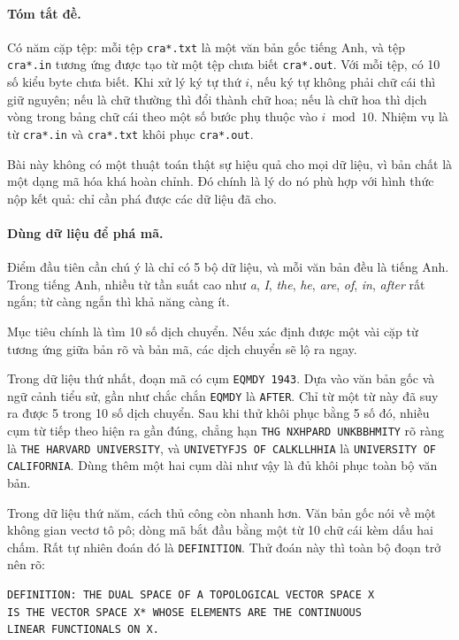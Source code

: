 \documentclass[11pt]{article}
\begin{document}
\paragraph{Tóm tắt đề.}
Có năm cặp tệp: mỗi tệp \texttt{cra*.txt} là một văn bản gốc tiếng Anh, và
tệp \texttt{cra*.in} tương ứng được tạo từ một tệp chưa biết
\texttt{cra*.out}. Với mỗi tệp, có 10 số kiểu byte chưa biết. Khi xử lý ký tự
thứ \(i\), nếu ký tự không phải chữ cái thì giữ nguyên; nếu là chữ thường thì
đổi thành chữ hoa; nếu là chữ hoa thì dịch vòng trong bảng chữ cái theo một
số bước phụ thuộc vào \(i\bmod 10\). Nhiệm vụ là từ \texttt{cra*.in} và
\texttt{cra*.txt} khôi phục \texttt{cra*.out}.

Bài này không có một thuật toán thật sự hiệu quả cho mọi dữ liệu, vì bản chất
là một dạng mã hóa khá hoàn chỉnh. Đó chính là lý do nó phù hợp với hình thức
nộp kết quả: chỉ cần phá được các dữ liệu đã cho.

\paragraph{Dùng dữ liệu để phá mã.}
Điểm đầu tiên cần chú ý là chỉ có 5 bộ dữ liệu, và mỗi văn bản đều là tiếng
Anh. Trong tiếng Anh, nhiều từ tần suất cao như \textit{a}, \textit{I},
\textit{the}, \textit{he}, \textit{are}, \textit{of}, \textit{in},
\textit{after} rất ngắn; từ càng ngắn thì khả năng càng ít.

Mục tiêu chính là tìm 10 số dịch chuyển. Nếu xác định được một vài cặp từ
tương ứng giữa bản rõ và bản mã, các dịch chuyển sẽ lộ ra ngay.

Trong dữ liệu thứ nhất, đoạn mã có cụm \texttt{EQMDY 1943}. Dựa vào văn bản
gốc và ngữ cảnh tiểu sử, gần như chắc chắn \texttt{EQMDY} là
\texttt{AFTER}. Chỉ từ một từ này đã suy ra được 5 trong 10 số dịch chuyển.
Sau khi thử khôi phục bằng 5 số đó, nhiều cụm từ tiếp theo hiện ra gần đúng,
chẳng hạn \texttt{THG NXHPARD UNKBBHMITY} rõ ràng là
\texttt{THE HARVARD UNIVERSITY}, và \texttt{UNIVETYFJS OF CALKLLHHIA} là
\texttt{UNIVERSITY OF CALIFORNIA}. Dùng thêm một hai cụm dài như vậy là đủ
khôi phục toàn bộ văn bản.

Trong dữ liệu thứ năm, cách thủ công còn nhanh hơn. Văn bản gốc nói về một
không gian vectơ tô pô; dòng mã bắt đầu bằng một từ 10 chữ cái kèm dấu hai
chấm. Rất tự nhiên đoán đó là \texttt{DEFINITION}. Thử đoán này thì toàn bộ
đoạn trở nên rõ:

\begin{verbatim}
DEFINITION: THE DUAL SPACE OF A TOPOLOGICAL VECTOR SPACE X
IS THE VECTOR SPACE X* WHOSE ELEMENTS ARE THE CONTINUOUS
LINEAR FUNCTIONALS ON X.
\end{verbatim}
\end{document}
